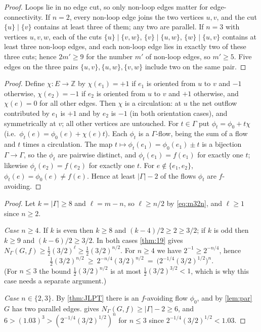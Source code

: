 \documentclass[11pt,a4paper]{article}
\theoremstyle{plain}
\theoremstyle{definition}
\theoremstyle{remark}
\newcommand{\Z}{{\mathbb Z}}
\newcommand{\Nf}{N}
\begin{document}
\label{pf:par}
\lempar*
\begin{proof}
Loops lie in no edge cut, so only non-loop edges matter for edge-connectivity. If $n=2$, every non-loop edge joins the two vertices $u,v$, and the cut $\{u\}\mid\{v\}$ contains at least three of them; any two are parallel. If $n=3$ with vertices $u,v,w$, each of the cuts $\{u\}\mid\{v,w\}$, $\{v\}\mid\{u,w\}$, $\{w\}\mid\{u,v\}$ contains at least three non-loop edges, and each non-loop edge lies in exactly two of these three cuts; hence $2m'\ge9$ for the number $m'$ of non-loop edges, so $m'\ge5$. Five edges on the three pairs $\{u,v\},\{u,w\},\{v,w\}$ include two on the same pair.
\end{proof}

\label{pf:shift}
\lemshift*
\begin{proof}
Define $\chi\colon E\to\Z$ by $\chi(e_1)=+1$ if $e_1$ is oriented from $u$ to $v$ and $-1$ otherwise, $\chi(e_2)=-1$ if $e_2$ is oriented from $u$ to $v$ and $+1$ otherwise, and $\chi(e)=0$ for all other edges. Then $\chi$ is a circulation: at $u$ the net outflow contributed by $e_1$ is $+1$ and by $e_2$ is $-1$ (in both orientation cases), and symmetrically at $v$; all other vertices are untouched. For $t\in\Gamma$ put $\phi_t=\phi_0+t\chi$ (i.e.\ $\phi_t(e)=\phi_0(e)+\chi(e)t$). Each $\phi_t$ is a $\Gamma$-flow, being the sum of a flow and $t$ times a circulation. The map $t\mapsto\phi_t(e_1)=\phi_0(e_1)\pm t$ is a bijection $\Gamma\to\Gamma$, so the $\phi_t$ are pairwise distinct, and $\phi_t(e_1)=f(e_1)$ for exactly one $t$; likewise $\phi_t(e_2)=f(e_2)$ for exactly one $t$. For $e\notin\{e_1,e_2\}$, $\phi_t(e)=\phi_0(e)\ne f(e)$. Hence at least $|\Gamma|-2$ of the flows $\phi_t$ are $f$-avoiding.
\end{proof}

\label{pf:large}
\proplarge*
\begin{proof}
Let $k=|\Gamma|\ge8$ and $\ell=m-n$, so $\ell\ge n/2$ by \eqref{eq:m32n}, and $\ell\ge1$ since $n\ge2$.

\emph{Case $n\ge4$.} If $k$ is even then $k\ge8$ and $(k-4)/2\ge2\ge3/2$; if $k$ is odd then $k\ge9$ and $(k-6)/2\ge3/2$. In both cases \cref{thm:19} gives $\Nf_\Gamma(G,f)\ge\frac12(3/2)^{\ell}\ge\frac12(3/2)^{n/2}$. For $n\ge4$ we have $2^{-1}\ge2^{-n/4}$, hence
\[
 \tfrac12(3/2)^{n/2}\ \ge\ 2^{-n/4}(3/2)^{n/2}\ =\ \bigl(2^{-1/4}(3/2)^{1/2}\bigr)^{n}.
\]
(For $n\le3$ the bound $\frac12(3/2)^{n/2}$ is at most $\frac12(3/2)^{3/2}<1$, which is why this case needs a separate argument.)

\emph{Case $n\in\{2,3\}$.} By \cref{thm:JLPT} there is an $f$-avoiding flow $\phi_0$, and by \cref{lem:par} $G$ has two parallel edges.  gives $\Nf_\Gamma(G,f)\ge|\Gamma|-2\ge6$, and $6>(1.03)^3>(2^{-1/4}(3/2)^{1/2})^{n}$ for $n\le3$ since $2^{-1/4}(3/2)^{1/2}<1.03$.
\end{proof}
\end{document}
